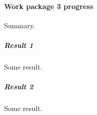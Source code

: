 
\paragraph{Work package 3 progress}

Summary.

\subparagraph{Result 1}

Some result.

\subparagraph{Result 2}

Some result.